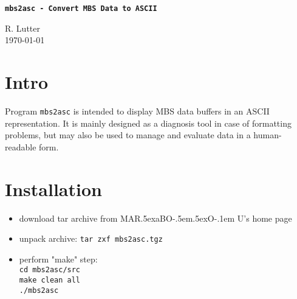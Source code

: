 \documentclass[12pt]{article}
\def\MARaBOU{MAR\lower.5ex\hbox{a}BO\kern-.5em\lower.5ex\hbox{O}\kern-.1em U}%
\begin{document}
\begin{Large}\begin{center}
\texttt{\textbf{mbs2asc - Convert MBS Data to ASCII}}
\end{center}\end{Large}
\begin{center}
 \vspace{2cm}
R. Lutter\\\today
\end{center}\vspace{3cm}

\section{Intro}
\noindent Program \texttt{mbs2asc} is intended to display MBS data buffers in an ASCII representation.
It is mainly designed as a diagnosis tool in case of formatting problems,
but may also be used to manage and evaluate data in a human-readable form.


\section{Installation}
\begin{center}
\begin{itemize}
\setlength{\rightmargin}{1em}%
\setlength{\leftmargin}{2em}%
\setlength{\itemsep}{0pt}%
\setlength{\parskip}{1mm}%
\setlength{\partopsep}{0pt}%
\setlength{\parsep}{0pt}%
\setlength{\topsep}{0pt}%
\item	download tar archive from \MARaBOU{}'s home page
\item	unpack archive: \texttt{tar zxf mbs2asc.tgz}
\item	perform "make" step:\\
	\quote\texttt{cd mbs2asc/src}\\
	\texttt{make clean all}\\
	\texttt{./mbs2asc}
\end{itemize}
\end{center}
\newpage	
\end{document}
